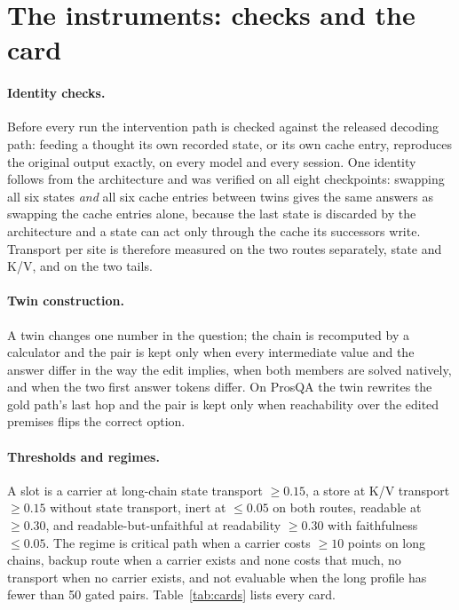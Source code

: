 
\appendix
\section{The instruments: checks and the card}\label{app:instruments}

\paragraph{Identity checks.} Before every run the intervention path is checked against the released decoding path: feeding a thought its own recorded state, or its own cache entry, reproduces the original output exactly, on every model and every session. One identity follows from the architecture and was verified on all eight checkpoints: swapping all six states \emph{and} all six cache entries between twins gives the same answers as swapping the cache entries alone, because the last state is discarded by the architecture and a state can act only through the cache its successors write. Transport per site is therefore measured on the two routes separately, state and K/V, and on the two tails.

\paragraph{Twin construction.} A twin changes one number in the question; the chain is recomputed by a calculator and the pair is kept only when every intermediate value and the answer differ in the way the edit implies, when both members are solved natively, and when the two first answer tokens differ. On ProsQA the twin rewrites the gold path's last hop and the pair is kept only when reachability over the edited premises flips the correct option.

\paragraph{Thresholds and regimes.} A slot is a carrier at long-chain state transport $\ge 0.15$, a store at K/V transport $\ge 0.15$ without state transport, inert at $\le 0.05$ on both routes, readable at $\ge 0.30$, and readable-but-unfaithful at readability $\ge 0.30$ with faithfulness $\le 0.05$. The regime is critical path when a carrier costs $\ge 10$ points on long chains, backup route when a carrier exists and none costs that much, no transport when no carrier exists, and not evaluable when the long profile has fewer than 50 gated pairs. Table~\ref{tab:cards} lists every card.

